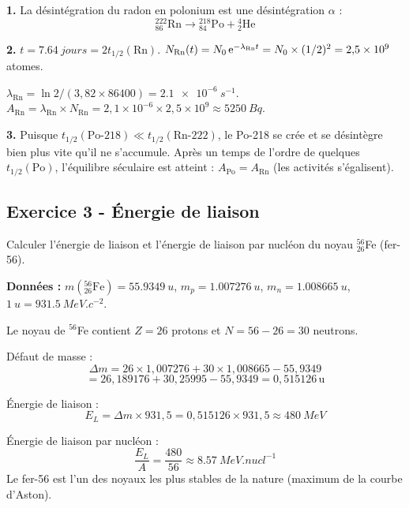 \documentclass[12pt,a4paper]{article}
\begin{document}
\begin{boitecorrige}
\textbf{1.} La désintégration du radon en polonium est une désintégration $\alpha$ :
\[
{}^{222}_{86}\text{Rn} \longrightarrow {}^{218}_{84}\text{Po} + {}^4_2\text{He}
\]

\textbf{2.} $t = \qty{7.64}{jours} = 2t_{1/2}(\text{Rn})$. $N_{\text{Rn}}(t) = N_0\,\mathrm{e}^{-\lambda_{\text{Rn}}t} = N_0\times(1/2)^2 = 2{,}5\times10^9$ atomes.

$\lambda_{\text{Rn}} = \ln2/(3{,}82\times86400) = \qty{2.1e-6}{s^{-1}}$.
$A_{\text{Rn}} = \lambda_{\text{Rn}}\times N_{\text{Rn}} = 2{,}1\times10^{-6}\times2{,}5\times10^9 \approx \qty{5250}{Bq}$.

\textbf{3.} Puisque $t_{1/2}(\text{Po-218}) \ll t_{1/2}(\text{Rn-222})$, le Po-218 se crée et se désintègre bien plus vite qu'il ne s'accumule. Après un temps de l'ordre de quelques $t_{1/2}(\text{Po})$, l'équilibre séculaire est atteint : $A_{\text{Po}} = A_{\text{Rn}}$ (les activités s'égalisent).
\end{boitecorrige}

\subsection*{Exercice 3 - Énergie de liaison \niveau{\moyen}}

\begin{boiteexercice}
Calculer l'énergie de liaison et l'énergie de liaison par nucléon du noyau ${}^{56}_{26}$Fe (fer-56).

\textbf{Données :} $m({}^{56}_{26}\text{Fe}) = \qty{55.9349}{u}$, $m_p = \qty{1.007276}{u}$, $m_n = \qty{1.008665}{u}$, $\qty{1}{u} = \qty{931.5}{MeV.c^{-2}}$.
\end{boiteexercice}

\begin{boitecorrige}
Le noyau de ${}^{56}$Fe contient $Z=26$ protons et $N=56-26=30$ neutrons.

Défaut de masse :
\[
\Delta m = 26\times1{,}007276 + 30\times1{,}008665 - 55{,}9349
\]
\[
= 26{,}189176 + 30{,}25995 - 55{,}9349 = 0{,}515126\,\text{u}
\]

Énergie de liaison :
\[
E_L = \Delta m\times931{,}5 = 0{,}515126\times931{,}5 \approx \qty{480}{MeV}
\]

Énergie de liaison par nucléon :
\[
\frac{E_L}{A} = \frac{480}{56} \approx \qty{8.57}{MeV.nucl^{-1}}
\]
Le fer-56 est l'un des noyaux les plus stables de la nature (maximum de la courbe d'Aston).
\end{boitecorrige}
\end{document}
